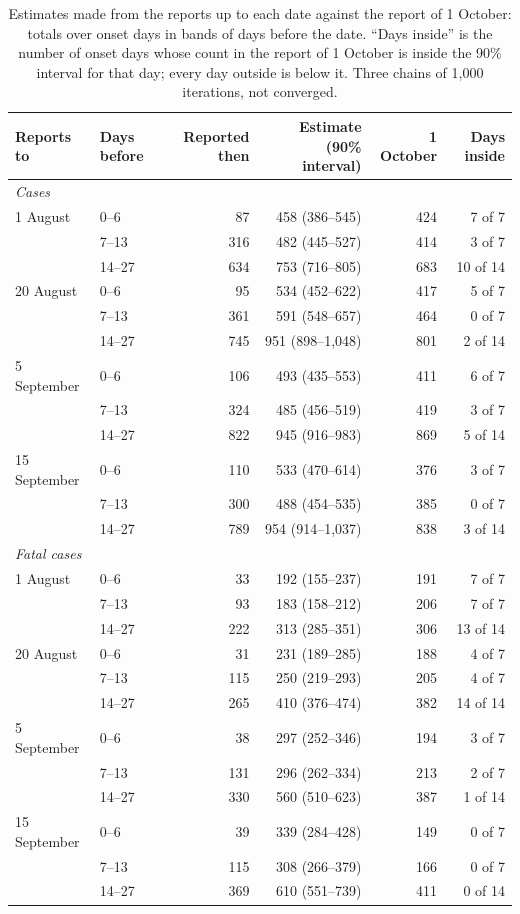 \documentclass[11pt,a4paper]{article}
\begin{document}
\begin{table}[h]
\centering
\begin{tabular}{llrrrr}
\toprule
Reports to & Days before & Reported then & Estimate (90\% interval) & 1 October & Days inside\\
\midrule
\multicolumn{6}{l}{\emph{Cases}}\\
1 August & 0--6 & 87 & 458 (386--545) & 424 & 7 of 7\\
 & 7--13 & 316 & 482 (445--527) & 414 & 3 of 7\\
 & 14--27 & 634 & 753 (716--805) & 683 & 10 of 14\\
20 August & 0--6 & 95 & 534 (452--622) & 417 & 5 of 7\\
 & 7--13 & 361 & 591 (548--657) & 464 & 0 of 7\\
 & 14--27 & 745 & 951 (898--1{,}048) & 801 & 2 of 14\\
5 September & 0--6 & 106 & 493 (435--553) & 411 & 6 of 7\\
 & 7--13 & 324 & 485 (456--519) & 419 & 3 of 7\\
 & 14--27 & 822 & 945 (916--983) & 869 & 5 of 14\\
15 September & 0--6 & 110 & 533 (470--614) & 376 & 3 of 7\\
 & 7--13 & 300 & 488 (454--535) & 385 & 0 of 7\\
 & 14--27 & 789 & 954 (914--1{,}037) & 838 & 3 of 14\\
\midrule
\multicolumn{6}{l}{\emph{Fatal cases}}\\
1 August & 0--6 & 33 & 192 (155--237) & 191 & 7 of 7\\
 & 7--13 & 93 & 183 (158--212) & 206 & 7 of 7\\
 & 14--27 & 222 & 313 (285--351) & 306 & 13 of 14\\
20 August & 0--6 & 31 & 231 (189--285) & 188 & 4 of 7\\
 & 7--13 & 115 & 250 (219--293) & 205 & 4 of 7\\
 & 14--27 & 265 & 410 (376--474) & 382 & 14 of 14\\
5 September & 0--6 & 38 & 297 (252--346) & 194 & 3 of 7\\
 & 7--13 & 131 & 296 (262--334) & 213 & 2 of 7\\
 & 14--27 & 330 & 560 (510--623) & 387 & 1 of 14\\
15 September & 0--6 & 39 & 339 (284--428) & 149 & 0 of 7\\
 & 7--13 & 115 & 308 (266--379) & 166 & 0 of 7\\
 & 14--27 & 369 & 610 (551--739) & 411 & 0 of 14\\
\bottomrule
\end{tabular}
\caption{Estimates made from the reports up to each date against the
report of 1 October: totals over onset days in bands of days before the
date. ``Days inside'' is the number of onset days whose count in the report
of 1 October is inside the 90\% interval for that day; every day outside
is below it. Three chains of 1{,}000 iterations, not converged.}
\label{tab:nowcast}
\end{table}
\end{document}
